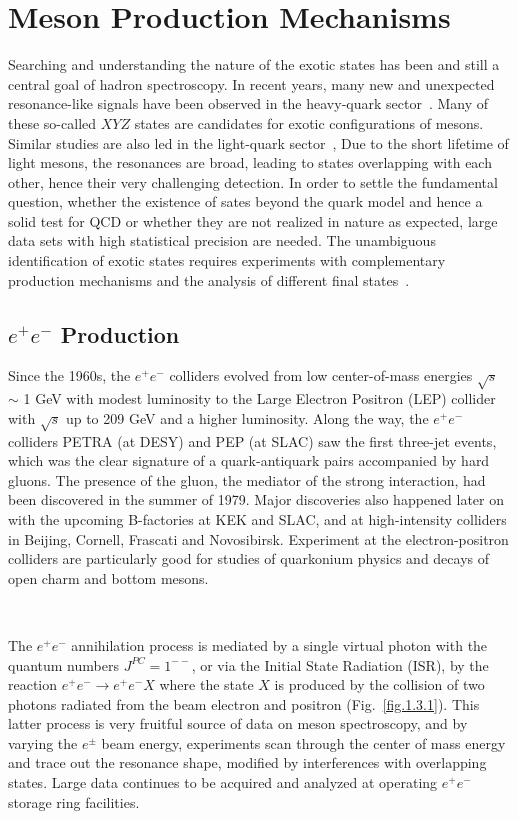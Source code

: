 \section{Meson Production Mechanisms}
\label{p.1.3}

Searching and understanding the nature of the exotic states has been and still a central goal of hadron spectroscopy. In recent years, many new and unexpected resonance-like signals have been observed in the heavy-quark sector~\cite{8}. Many of these so-called $XYZ$ states are candidates for exotic configurations of mesons. Similar studies are also led in the light-quark sector~\cite{8}, Due to the short lifetime of light mesons, the resonances are broad, leading to states overlapping with each other, hence their very challenging detection. In order to settle the fundamental question, whether the existence of sates beyond the quark model and hence a solid test for QCD or whether they are not realized in nature as expected, large data sets with high statistical precision are needed. The unambiguous identification of exotic states requires experiments with complementary production mechanisms and the analysis of different final states~\cite{14}.
 
\subsection{$e^{+}e^{-}$ Production}

Since the 1960s, the $e^{+}e^{-}$ colliders evolved from low center-of-mass energies $\sqrt{s}$ $\sim$ 1 GeV with modest luminosity to the Large Electron Positron (LEP) collider with $\sqrt{s}$ up to 209 GeV and a higher luminosity. Along the way, the $e^{+}e^{-}$ colliders PETRA (at DESY) and PEP (at SLAC) saw the first three-jet events, which was the clear signature of a quark-antiquark pairs accompanied by hard gluons. The presence of the gluon, the mediator of the strong interaction, had been discovered in the summer of 1979. Major discoveries also happened later on with the upcoming B-factories at KEK and SLAC, and at high-intensity colliders in Beijing, Cornell, Frascati and Novosibirsk. Experiment at the electron-positron colliders are particularly good for studies of quarkonium physics and decays of open charm and bottom mesons.

~\par The $e^{+}e^{-}$ annihilation process is mediated by a single virtual photon with the quantum numbers $J^{PC} = 1^{--}$, or via the Initial State Radiation (ISR), by the reaction $e^{+}e^{-} \rightarrow e^{+}e^{-}X$ where the state $X$ is produced by the collision of two photons radiated from the beam electron and positron (Fig.~\ref{fig.1.3.1}). This latter process is very fruitful source of data on meson spectroscopy, and by varying the $e^{\pm}$ beam energy, experiments scan through the center of mass energy and trace out the resonance shape, modified by interferences with overlapping states. Large data continues to be acquired and analyzed at operating $e^{+}e^{-}$ storage ring facilities.

